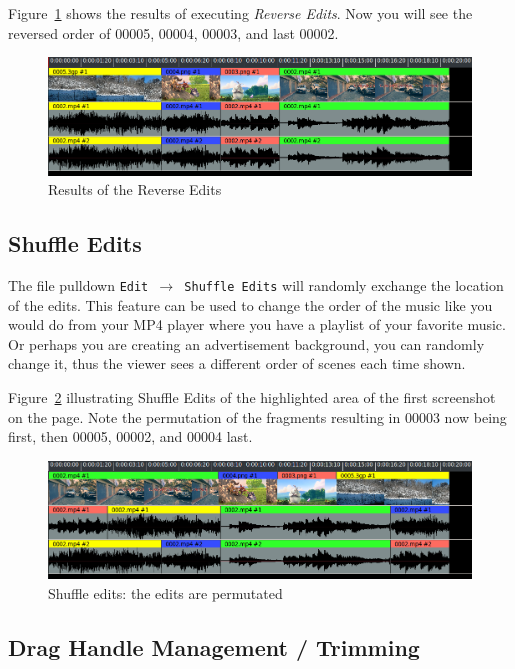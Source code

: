 Figure~\ref{fig:reverse02} shows the results of executing \textit{Reverse Edits}.  Now you will see the reversed order of 00005, 00004, 00003, and last 00002.
\begin{figure}[htpb]
    \centering
    \includegraphics[width=0.8\linewidth]{images/reverse02.png}
    \caption{Results of the Reverse Edits}
    \label{fig:reverse02}
\end{figure}

\subsection{Shuffle Edits}%
\label{sub:shuffle_edits}
 
The file pulldown \texttt{Edit $\rightarrow$ Shuffle Edits} will randomly exchange the location of the edits.  This feature can be used to change the order of the music like you would do from your MP4 player where you have a playlist of your favorite music.  Or perhaps you are creating an advertisement background, you can randomly change it, thus the viewer sees a different order of scenes each time shown.

Figure~\ref{fig:shuffle} illustrating Shuffle Edits of the highlighted area of the first screenshot on the page.  Note the permutation of the fragments resulting in 00003 now being first, then 00005, 00002, and 00004 last.
\begin{figure}[htpb]
    \centering
    \includegraphics[width=0.8\linewidth]{images/shuffle.png}
    \caption{Shuffle edits: the edits are permutated}
    \label{fig:shuffle}
\end{figure}

\subsection{Drag Handle Management / Trimming}%
\label{sub:drag_handle_management_trimming}

